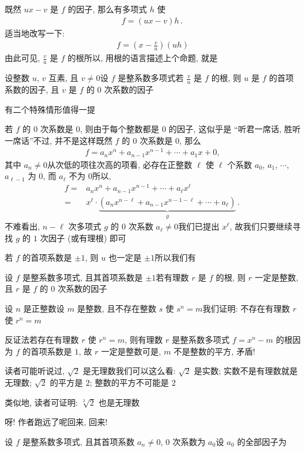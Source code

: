 既然 $ux - v$ 是 $f$ 的因子, 那么有多项式 $h$ 使
\begin{align*}
    f = (ux - v) h \period
\end{align*}
适当地改写一下:
\begin{align*}
    f = \left( x - \frac{v}{u} \right) (uh)
\end{align*}
由此可见, $\frac{v}{u}$ 是 $f$ 的根\period 所以, 用根的语言描述上个命题, 就是
\begin{proposition}
    设整数 $u$, $v$ 互素, 且 $v \neq 0$\period 设 $f$ 是整系数多项式\period 若 $\frac{v}{u}$ 是 $f$ 的根, 则 $u$ 是 $f$ 的首项系数的因子, 且 $v$ 是 $f$ 的 $0$ 次系数的因子\period
\end{proposition}

有二个特殊情形值得一提\period

若 $f$ 的 $0$ 次系数是 $0$, 则由于每个整数都是 $0$ 的因子, 这似乎是 ``听君一席话, 胜听一席话''\period 不过, 并不是这样\period 既然 $f$ 的 $0$ 次系数是 $0$, 那么
\begin{align*}
    f = a_n x^n + a_{n-1} x^{n-1} + \cdots + a_1 x + 0,
\end{align*}
其中 $a_n \neq 0$\period 从次低的项往次高的项看, 必存在正整数 $\ell$ 使 $\ell$ 个系数 $a_0$, $a_1$, $\cdots$, $a_{\ell-1}$ 为 $0$, 而 $a_{\ell}$ 不为 $0$\period 所以,
\begin{align*}
    f
    = {} & a_n x^n + a_{n-1} x^{n-1} + \cdots + a_\ell x^\ell                                                      \\
    = {} & x^{\ell} \cdot \underbrace{(a_n x^{n - \ell} + a_{n-1} x^{n - 1 - \ell} + \cdots + a_\ell)}_{g} \period
\end{align*}
不难看出, $n - \ell$ 次多项式 $g$ 的 $0$ 次系数 $a_{\ell} \neq 0$\period 我们已提出 $x^{\ell}$, 故我们只要继续寻找 $g$ 的 $1$ 次因子 (或有理根) 即可\period

若 $f$ 的首项系数是 $\pm 1$, 则 $u$ 也一定是 $\pm 1$\period 所以我们有
\begin{proposition}
    设 $f$ 是整系数多项式, 且其首项系数是 $\pm 1$\period 若有理数 $r$ 是 $f$ 的根, 则 $r$ 一定是整数, 且 $r$ 是 $f$ 的 $0$ 次系数的因子\period
\end{proposition}

\begin{example}
    设 $n$ 是正整数\period 设 $m$ 是整数, 且不存在整数 $s$ 使 $s^n = m$\period 我们证明: 不存在有理数 $r$ 使 $r^n = m$\period

    反证法\period 若存在有理数 $r$ 使 $r^n = m$, 则有理数 $r$ 是整系数多项式 $f = x^n - m$ 的根\period 因为 $f$ 的首项系数是 $1$, 故 $r$ 一定是整数\period 可是, $m$ 不是整数的平方, 矛盾!

    读者可能听说过, $\sqrt{2}$ 是无理数\period 我们可以这么看: $\sqrt{2}$ 是实数; 实数不是有理数就是无理数; $\sqrt{2}$ 的平方是 $2$; 整数的平方不可能是 $2$\period

    类似地, 读者可证明: $\sqrt[3]{2}$ 也是无理数\period
\end{example}

呀! 作者跑远了呢\period 回来, 回来!

设 $f$ 是整系数多项式, 且其首项系数 $a_n \neq 0$, $0$ 次系数为 $a_0$\period 设 $a_0$ 的全部因子为
